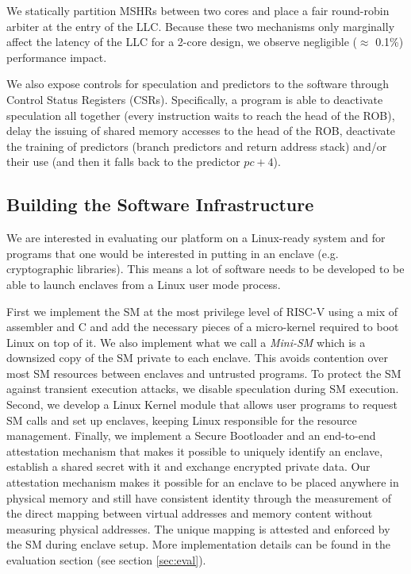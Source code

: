 We statically partition MSHRs between two cores and place a fair round-robin arbiter at the entry of the LLC.
Because these two mechanisms only marginally affect the latency of the LLC for a 2-core design, we observe negligible ($\approx$ 0.1\%) performance impact.

We also expose controls for speculation and predictors to the software through Control Status Registers (CSRs).
Specifically, a program is able to deactivate speculation all together (every instruction waits to reach the head of the ROB), delay the issuing of shared memory accesses to the head of the ROB, deactivate the training of predictors (branch predictors and return address stack) and/or their use (and then it falls back to the predictor $pc + 4$).

\subsection{Building the Software Infrastructure}

We are interested in evaluating our platform on a Linux-ready system and for programs that one would be interested in putting in an enclave (e.g. cryptographic libraries).
This means a lot of software needs to be developed to be able to launch enclaves from a Linux user mode process.

First we implement the SM at the most privilege level of RISC-V using a mix of assembler and C and add the necessary pieces of a micro-kernel required to boot Linux on top of it.
We also implement what we call a \emph{Mini-SM} which is a downsized copy of the SM private to each enclave. 
This avoids contention over most SM resources between enclaves and untrusted programs.
To protect the SM against transient execution attacks, we disable speculation during SM execution.
Second, 
we develop a Linux Kernel module that allows user programs to request SM calls and set up enclaves, keeping Linux responsible for the resource management.
Finally, we implement a Secure Bootloader and an end-to-end attestation mechanism that makes it possible to uniquely identify an enclave, establish a shared secret with it and exchange encrypted private data.
Our attestation mechanism makes it possible for an enclave to be placed anywhere in physical memory and still have consistent identity through the measurement of the direct mapping between virtual addresses and memory content without measuring physical addresses. 
The unique mapping is attested and enforced by the SM during enclave setup.
More implementation details can be found in the evaluation section (see section \ref{sec:eval}).